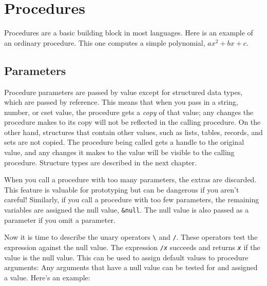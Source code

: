 \section{Procedures}

Procedures are a basic building block in most
languages. Here is an example of an ordinary procedure. This one
computes a simple polynomial, $a x^2 + b x + c$.


\subsection*{Parameters}

Procedure parameters are passed by value except for
structured data types, which are passed by
reference. This means that when you pass in a string,
number, or cset value, the procedure gets a \textit{copy} of that
value; any changes the procedure makes to its copy will not be
reflected in the calling procedure. On the other hand, structures that
contain other values, such as lists, tables, records, and sets are not
copied. The procedure being called gets a handle to the original value,
and any changes it makes to the value will be visible to the calling
procedure. Structure types are described in the next chapter.

When you call a procedure with too many
parameters, the extras are discarded. This feature is valuable for
prototyping but can be dangerous if you aren't
careful! Similarly, if you call a procedure with too few parameters,
the remaining variables are assigned the null value, \texttt{\&null}.
The null value is also passed as a parameter if you omit a parameter.

Now it is time to describe the unary operators \texttt{{\textbackslash}}
and \texttt{/}. These operators test the expression against the null
value. The expression \texttt{/}\texttt{\textit{x}}
succeeds and returns \texttt{\textit{x}} if the value is the null
value. This can be used to assign default values to procedure
arguments: Any arguments that have a null value can be tested for and
assigned a value. Here's an example:


